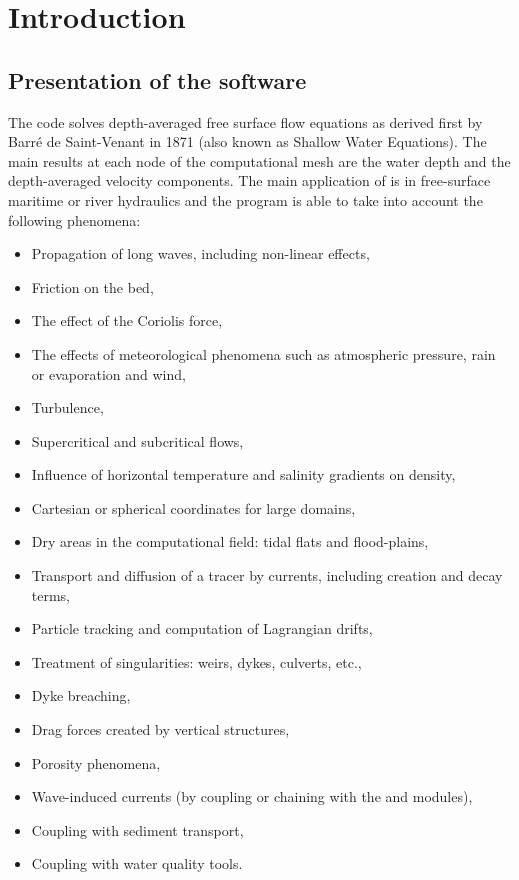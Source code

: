 \chapter{Introduction}
\label{ch:intro}


\section{Presentation of the  software}

The  code solves depth-averaged free surface flow equations
as derived first by Barr\'{e} de Saint-Venant in 1871
(also known as Shallow Water Equations).
The main results at each node of the computational mesh are the water depth
and the depth-averaged velocity components.
The main application of  is in free-surface maritime
or river hydraulics and the program is able to take into account the following
phenomena:

\begin{itemize}
\item Propagation of long waves, including non-linear effects,
\item Friction on the bed,
\item The effect of the Coriolis force,
\item The effects of meteorological phenomena such as atmospheric pressure, rain
 or evaporation and wind,
\item Turbulence,
\item Supercritical and subcritical flows,
\item Influence of horizontal temperature and salinity gradients on density,
\item Cartesian or spherical coordinates for large domains,
\item Dry areas in the computational field: tidal flats and flood-plains,
\item Transport and diffusion of a tracer by currents, including creation
and decay terms,
\item Particle tracking and computation of Lagrangian drifts,
\item Treatment of singularities: weirs, dykes, culverts, etc.,
\item Dyke breaching,
\item Drag forces created by vertical structures,
\item Porosity phenomena,
\item Wave-induced currents (by coupling or chaining with the \artemis and
\tomawac modules),
\item Coupling with sediment transport,
\item Coupling with water quality tools.
\end{itemize}

